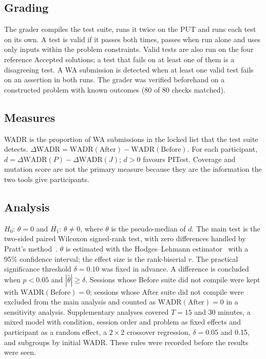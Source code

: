 \subsection{Grading}
The grader compiles the test suite, runs it twice on the PUT and runs each test on its own. A test is valid if it passes both times, passes when run alone and uses only inputs within the problem constraints. Valid tests are also run on the four reference Accepted solutions; a test that fails on at least one of them is a disagreeing test. A WA submission is detected when at least one valid test fails on an assertion in both runs. The grader was verified beforehand on a constructed problem with known outcomes (80 of 80 checks matched).

\subsection{Measures}
WADR is the proportion of WA submissions in the locked list that the test suite detects. $\Delta\mathrm{WADR} = \mathrm{WADR(After)} - \mathrm{WADR(Before)}$. For each participant, $d = \Delta\mathrm{WADR}(P) - \Delta\mathrm{WADR}(J)$; $d > 0$ favours PITest. Coverage and mutation score are not the primary measure because they are the information the two tools give participants.

\subsection{Analysis}
$H_0$: $\theta = 0$ and $H_1$: $\theta \neq 0$, where $\theta$ is the pseudo-median of $d$. The main test is the two-sided paired Wilcoxon signed-rank test, with zero differences handled by Pratt's method~\cite{pratt1959}. $\theta$ is estimated with the Hodges--Lehmann estimator~\cite{hodges1963} with a 95\% confidence interval; the effect size is the rank-biserial $r$. The practical significance threshold $\delta = 0.10$ was fixed in advance. A difference is concluded when $p < 0.05$ and $|\hat{\theta}| \geq \delta$. Sessions whose Before suite did not compile were kept with $\mathrm{WADR(Before)} = 0$; sessions whose After suite did not compile were excluded from the main analysis and counted as $\mathrm{WADR(After)} = 0$ in a sensitivity analysis. Supplementary analyses covered $T = 15$ and 30 minutes, a mixed model with condition, session order and problem as fixed effects and participant as a random effect, a $2\times2$ crossover regression, $\delta = 0.05$ and 0.15, and subgroups by initial WADR. These rules were recorded before the results were seen.
